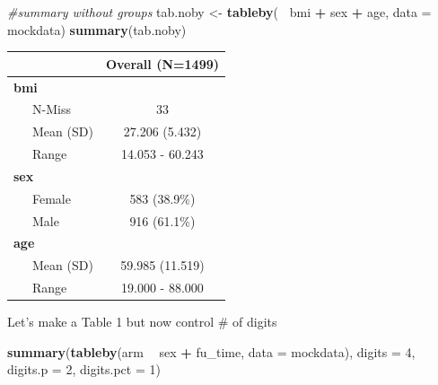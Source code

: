 \documentclass[fleqn,10pt,lineno]{wlpeerj} %
\newenvironment{Shaded}{\begin{snugshade}}{\end{snugshade}}
\newcommand{\CommentTok}[1]{\textcolor[rgb]{0.56,0.35,0.01}{\textit{#1}}}
\newcommand{\DataTypeTok}[1]{\textcolor[rgb]{0.13,0.29,0.53}{#1}}
\newcommand{\DecValTok}[1]{\textcolor[rgb]{0.00,0.00,0.81}{#1}}
\newcommand{\KeywordTok}[1]{\textcolor[rgb]{0.13,0.29,0.53}{\textbf{#1}}}
\newcommand{\NormalTok}[1]{#1}
\newcommand{\OperatorTok}[1]{\textcolor[rgb]{0.81,0.36,0.00}{\textbf{#1}}}
\newcommand{\StringTok}[1]{\textcolor[rgb]{0.31,0.60,0.02}{#1}}
\begin{document}
\begin{Shaded}
\begin{Highlighting}[]
\CommentTok{#summary without groups}
\NormalTok{tab.noby <-}\StringTok{ }\KeywordTok{tableby}\NormalTok{(}\OperatorTok{~}\StringTok{ }\NormalTok{bmi }\OperatorTok{+}\StringTok{ }\NormalTok{sex }\OperatorTok{+}\StringTok{ }\NormalTok{age, }\DataTypeTok{data =}\NormalTok{ mockdata)}
\KeywordTok{summary}\NormalTok{(tab.noby)}
\end{Highlighting}
\end{Shaded}

\begin{longtable}[]{@{}lc@{}}
\toprule
& Overall (N=1499)\tabularnewline
\midrule
\endhead
\textbf{bmi} &\tabularnewline
~~~N-Miss & 33\tabularnewline
~~~Mean (SD) & 27.206 (5.432)\tabularnewline
~~~Range & 14.053 - 60.243\tabularnewline
\textbf{sex} &\tabularnewline
~~~Female & 583 (38.9\%)\tabularnewline
~~~Male & 916 (61.1\%)\tabularnewline
\textbf{age} &\tabularnewline
~~~Mean (SD) & 59.985 (11.519)\tabularnewline
~~~Range & 19.000 - 88.000\tabularnewline
\bottomrule
\end{longtable}

Let's make a Table 1 but now control \# of digits

\begin{Shaded}
\begin{Highlighting}[]
\KeywordTok{summary}\NormalTok{(}\KeywordTok{tableby}\NormalTok{(arm }\OperatorTok{~}\StringTok{ }\NormalTok{sex }\OperatorTok{+}\StringTok{ }\NormalTok{fu_time, }\DataTypeTok{data =}\NormalTok{ mockdata), }
        \DataTypeTok{digits =} \DecValTok{4}\NormalTok{, }\DataTypeTok{digits.p =} \DecValTok{2}\NormalTok{, }\DataTypeTok{digits.pct =} \DecValTok{1}\NormalTok{)}
\end{Highlighting}
\end{Shaded}
\end{document}
